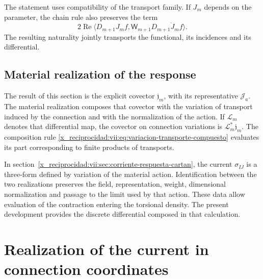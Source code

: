 The statement uses compatibility of the transport family.
If \(J_m\) depends on the parameter, the chain rule also
preserves the term
\[
 2\operatorname{Re}
 \langle D_{m+1}J_mf,\mathsf W_{m+1}D_{m+1}\dot J_mf\rangle.
\]
The resulting naturality jointly transports the functional, its
incidences and its differential.

\section{Material realization of the response}
\label{x_reciprocidad:vii:subsec:realizacion-respuesta-discreta}

The result of this section is the explicit covector
\(\mathfrak j_m\), with its representative \(\mathcal J_a\).
The material realization composes that covector with the variation of
transport induced by the connection and with the normalization of the action.
If \(\mathcal L_m\) denotes that differential map, the covector on
connection variations is \(\mathcal L_m^*\mathfrak j_m\).
The composition rule
\eqref{x_reciprocidad:vii:eq:variacion-transporte-compuesto} evaluates its part
corresponding to finite products of transports.

In section~\ref{x_reciprocidad:vii:sec:corriente-respuesta-cartan}, the current
\(\sigma_{IJ}\) is a three-form defined by variation of the material
action. Identification between the two realizations preserves the field,
representation, weight, dimensional normalization and passage to the
limit used by that action. These data allow evaluation of the
contraction entering the torsional density. The present
development provides the discrete differential composed in that calculation.




\chapter{Realization of the current in connection coordinates}
\label{x_reciprocidad:vii:sec:composicion-corriente-conexion}

